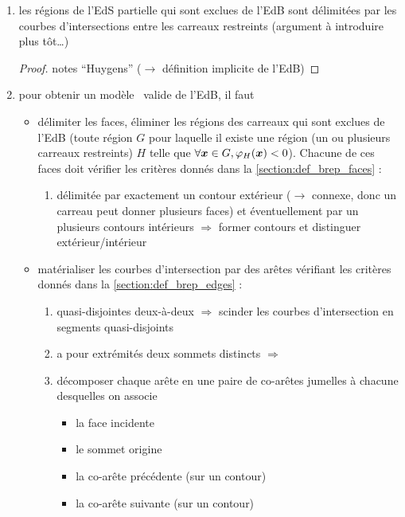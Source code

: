 \begin{enumerate}
	\item les régions de l'EdS partielle qui sont exclues de l'EdB sont délimitées par les courbes d'intersections entre les carreaux restreints (argument à introduire plus tôt\ldots)\\
	\begin{proof}
		\cf notes ``Huygens'' ($\to$ définition implicite de l'EdB)
	\end{proof}
	\item pour obtenir un modèle \brep\ valide de l'EdB, il faut
	\begin{itemize}
		\item délimiter les faces, \ie éliminer les régions des carreaux qui sont exclues de l'EdB (\ie toute région $G$ pour laquelle il existe une région (\eg un ou plusieurs carreaux restreints) $H$ telle que $\forall \bm{x} \in G, \varphi_{H}(\bm{x}) < 0$). Chacune de ces faces doit vérifier les critères donnés dans la \autoref{section:def_brep_faces} :
		\begin{enumerate}
			\item délimitée par exactement un contour extérieur ($\to$ connexe, donc un carreau peut donner plusieurs faces) et éventuellement par un plusieurs contours intérieurs $\Rightarrow$ former contours et distinguer extérieur/intérieur
		\end{enumerate}
		
		\item matérialiser les courbes d'intersection par des arêtes vérifiant les critères donnés dans la \autoref{section:def_brep_edges} :
		\begin{enumerate}
			\item quasi-disjointes deux-à-deux $\Rightarrow$ scinder les courbes d'intersection en segments quasi-disjoints
			\item a pour extrémités deux sommets distincts $\Rightarrow$ 
			\item décomposer chaque arête en une paire de co-arêtes jumelles à chacune desquelles on associe 
			\begin{itemize}
				\item la face incidente
				\item le sommet origine
				\item la co-arête précédente (sur un contour)
				\item la co-arête suivante (sur un contour)
			\end{itemize}			 
		\end{enumerate}
		

\end{itemize}
\end{enumerate}
